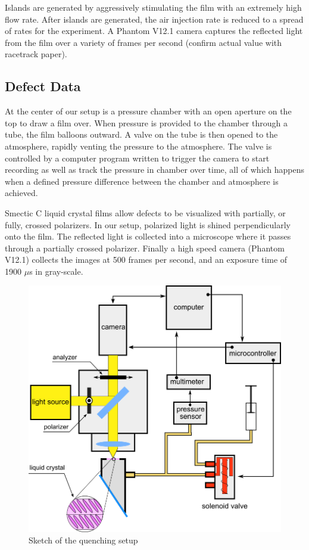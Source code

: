 \documentclass[prl,reprint,showpacs,floatfix,nofootinbib]{revtex4-1}
\begin{document}
Islands are generated by aggressively stimulating the film with an extremely high flow rate. After islands are generated, the air injection rate is reduced to a spread of rates for the experiment. A Phantom V12.1 camera captures the reflected light from the film over a variety of frames per second (confirm actual value with racetrack paper). 


\subsection{Defect Data}

At the center of our setup is a pressure chamber with an open aperture on the top to draw a film over. When pressure is provided to the chamber through a tube, the film balloons outward. A valve on the tube is then opened to the atmosphere, rapidly venting the pressure to the atmosphere. The valve is controlled by a computer program written to trigger the camera to start recording as well as track the pressure in chamber over time, all of which happens when a defined pressure difference between the chamber and atmosphere is achieved. 


Smectic C liquid crystal films allow defects to be visualized with partially, or fully, crossed polarizers. In our setup, polarized light is shined perpendicularly onto the film. The reflected light is collected into a microscope where it passes through a partially crossed polarizer. Finally a high speed camera (Phantom V12.1) collects the images at 500 frames per second, and an exposure time of 1900 $\mu$s in gray-scale.

\begin{figure}
  \includegraphics[width=\linewidth]{quench-schematic.png}
  \caption{Sketch of the quenching setup}
  \label{fig:Setup Sketch}
\end{figure}
\end{document}
